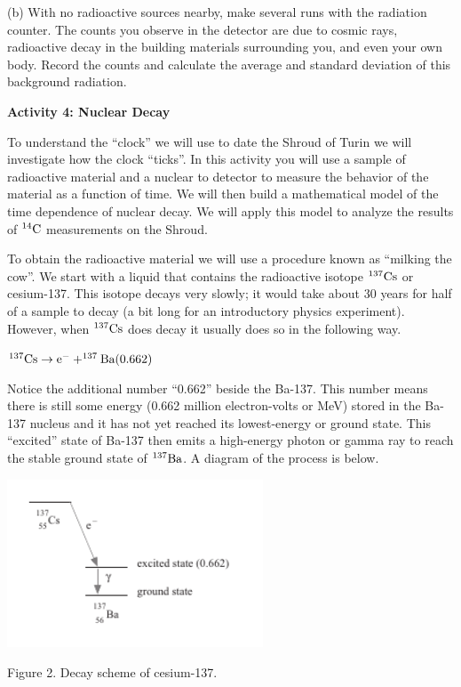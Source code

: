 (b) With no radioactive sources nearby, make several runs with the radiation counter.
The counts you observe in the detector are due to cosmic rays, radioactive decay
in the building materials surrounding you, and even your own body.
Record the counts and calculate the average and standard deviation of this background
radiation.
\answerspace{15mm}

\pagebreak[2]
\textbf{Activity 4: Nuclear Decay }

To understand the ``clock'' we will use to date the Shroud of Turin we will investigate
how the clock ``ticks''.
In this activity you will use a sample of radioactive material and a nuclear to 
detector to measure the behavior of the material as a function of time.
We will then build a mathematical model of the time dependence of nuclear decay.
We will apply this model to analyze the results of $\rm ^{14}C$ measurements on
the Shroud.

To obtain the radioactive material we will use a procedure known as
``milking the cow''.
We start with a liquid that contains the radioactive isotope $\rm ^{137}Cs$ or
cesium-137.
This isotope decays very slowly; it would take about 30 years for half of a sample
to decay (a bit long for an introductory physics experiment).
However, when $\rm ^{137}Cs$ does decay it usually does so in the following way.

{\centering \( \rm ^{137}Cs \rightarrow e^- + ^{137}Ba(0.662) \) \par}

Notice the additional number ``0.662'' beside the Ba-137. This number means there
is still some energy (0.662 million electron-volts or MeV)
stored in the Ba-137 nucleus and it has not yet reached
its lowest-energy or ground state.
This ``excited'' state of Ba-137 then emits a high-energy photon or gamma ray to 
reach the stable ground state of $\rm {^{137}Ba}$. A diagram of the
process is below. 

\vspace{-0.3cm}
\begin{center}
\includegraphics[width=3in]{radiocarbon_dating/Cs-137_decay_bw.pdf}
\vspace{-0.6cm}

Figure 2. Decay scheme of cesium-137. 
\end{center}

